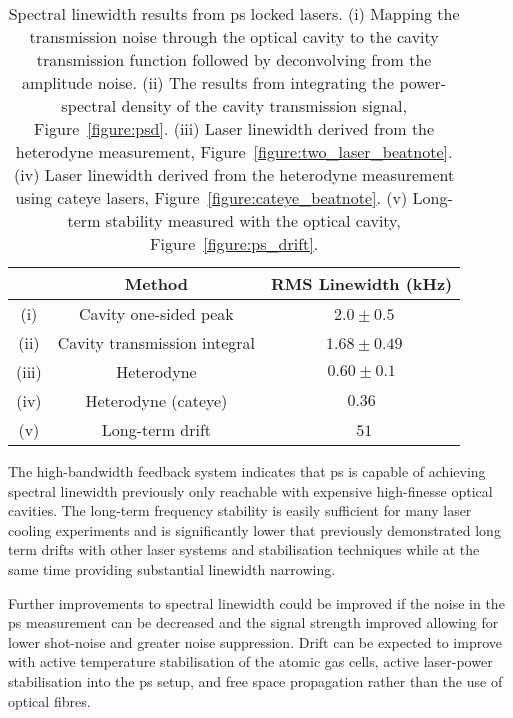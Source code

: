 \begin{table}
\centering
\begin{tabular}{c c c}
\\
\hline
        & Method                       & RMS Linewidth (kHz) \\ \hline
  (i)   & Cavity one-sided peak        & \,\,$2.0 \pm 0.5$   \\
  (ii)  & Cavity transmission integral & \,\,$1.68 \pm 0.49$ \\
  (iii) & Heterodyne                   & $0.60\pm0.1$        \\
  (iv)  & Heterodyne (cateye)          & $0.36$              \\
  (v)   & Long-term drift              & \,\,$51$            \\ \hline\end{tabular}

\caption{Spectral linewidth results from \gls{ps} locked lasers.
(i) Mapping the transmission noise through the optical cavity to the cavity transmission function followed by deconvolving from the amplitude noise.
(ii) The results from integrating the power-spectral density of the cavity transmission signal, Figure~\ref{figure:psd}.
(iii) Laser linewidth derived from the heterodyne measurement, Figure~\ref{figure:two_laser_beatnote}.
(iv) Laser linewidth derived from the heterodyne measurement using cateye lasers, Figure~\ref{figure:cateye_beatnote}.
(v) Long-term stability measured with the optical cavity, Figure~\ref{figure:ps_drift}.}
\label{table:linewidths}
\end{table}

The high-bandwidth feedback system indicates that \gls{ps} is capable of achieving spectral linewidth previously only reachable with expensive high-finesse optical cavities.
The long-term frequency stability is easily sufficient for many laser cooling experiments and is significantly lower that previously demonstrated long term drifts with other laser systems and stabilisation techniques while at the same time providing substantial linewidth narrowing.

Further improvements to spectral linewidth could be improved if the noise in the \gls{ps} measurement can be decreased and the signal strength improved allowing for lower shot-noise and greater noise suppression.
Drift can be expected to improve with active temperature stabilisation of the atomic gas cells, active laser-power stabilisation into the \gls{ps} setup, and free space propagation rather than the use of optical fibres.

